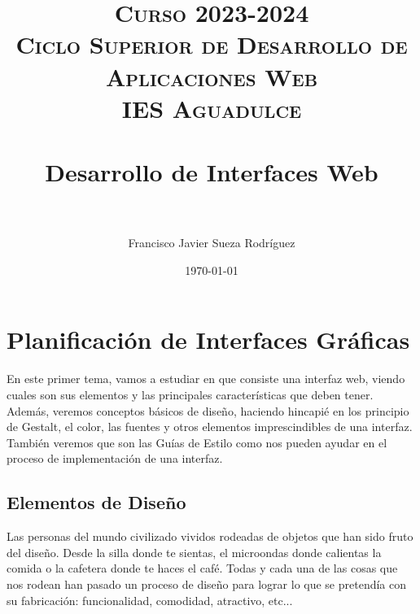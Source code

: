 


\title{
\normalfont \normalsize
\textsc{{\bfseries Curso 2023-2024} \\ Ciclo Superior de Desarrollo de Aplicaciones Web \\ IES Aguadulce} \\ [25pt]
\horrule{0.5pt} \\[0.4cm]
\huge Desarrollo de Interfaces Web \\
\horrule{0.5pt} \\[0.4cm]
}

\author{Francisco Javier Sueza Rodríguez}
\date{\normalsize\today}

\makeglossaries
{}



\maketitle

\newpage

\tableofcontents

\listoffigures


\newpage

\chapter{Planificación de Interfaces Gráficas}
En este primer tema, vamos a estudiar en que consiste una interfaz web, viendo cuales son sus elementos  y las principales características que deben tener. Además, veremos conceptos básicos de diseño, haciendo hincapié en los principio de Gestalt, el color, las fuentes y otros elementos imprescindibles de una interfaz. También veremos que son las Guías de Estilo como nos pueden ayudar en el proceso de implementación de una interfaz.

\section{Elementos de Diseño}
Las personas del mundo civilizado vividos rodeadas de objetos que han sido fruto del diseño. Desde la silla donde te sientas, el microondas donde calientas la comida o la cafetera donde te haces el café. Todas y cada una de las cosas que nos rodean han pasado un proceso de diseño para lograr lo que se pretendía con su fabricación: funcionalidad, comodidad, atractivo, etc...

